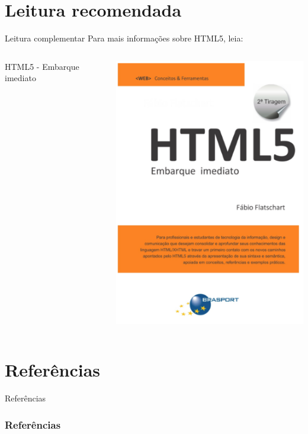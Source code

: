 \documentclass{beamer}
\begin{document}
\section{Leitura recomendada}
\begin{frame}{Leitura complementar}
 Para mais informações sobre HTML5, leia:\\
 \begin{columns}
   \begin{column}{0.4\textwidth}
     HTML5 - Embarque imediato\\ 
      \cite{flatschart2011html}
   \end{column}
   \begin{column}{0.3\textwidth}
    \begin{center}
  \includegraphics[height=0.5\paperheight]{fig/aula2/flatschart2014html.png} \\
 \end{center}
   \end{column}
 \end{columns}
\end{frame}
\section{Referências}
\begin{frame}{Referências}%
\frametitle{Referências}
\small
\begin{center}
\tiny


\end{center}
\end{frame}
 
\end{document}
